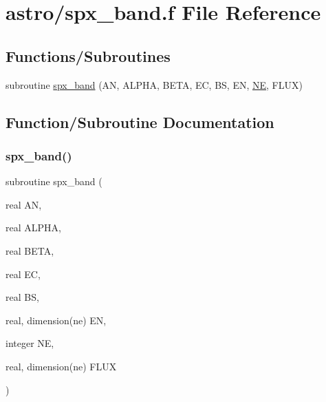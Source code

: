 \hypertarget{spx__band_8f}{}\section{astro/spx\+\_\+band.f File Reference}
\label{spx__band_8f}
\subsection*{Functions/\+Subroutines}
\begin{DoxyCompactItemize}
\item 
subroutine \hyperlink{spx__band_8f_a46c82b0935365fb2eba74593e7e62de8}{spx\+\_\+band} (AN, A\+L\+P\+HA, B\+E\+TA, EC, BS, EN, \hyperlink{eval__tab_8h_a5af9139e882aef6c820ae908589a40d6}{NE}, F\+L\+UX)
\end{DoxyCompactItemize}


\subsection{Function/\+Subroutine Documentation}
\mbox{\label{spx__band_8f_a46c82b0935365fb2eba74593e7e62de8}} 
\subsubsection{\texorpdfstring{spx\+\_\+band()}{spx\_band()}}
{\footnotesize\ttfamily subroutine spx\+\_\+band (\begin{DoxyParamCaption}\item[{real}]{AN,  }\item[{real}]{A\+L\+P\+HA,  }\item[{real}]{B\+E\+TA,  }\item[{real}]{EC,  }\item[{real}]{BS,  }\item[{real, dimension(ne)}]{EN,  }\item[{integer}]{NE,  }\item[{real, dimension(ne)}]{F\+L\+UX }\end{DoxyParamCaption})}

